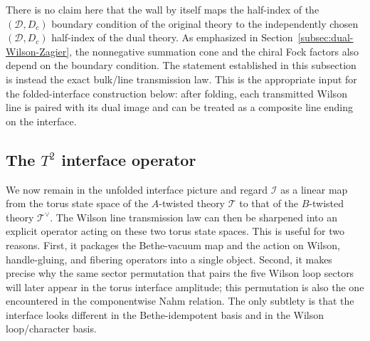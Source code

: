 \documentclass[11pt,a4paper]{article}
\numberwithin{equation}{section}
\begin{document}
There is no claim here that the wall by itself maps the half-index of the $(\mathcal D,D_c)$ boundary condition of the original theory to the independently chosen $(\mathcal D,D_c)$ half-index of the dual theory.  As emphasized in Section~\ref{subsec:dual-Wilson-Zagier}, the nonnegative summation cone and the chiral Fock factors also depend on the boundary condition.  The statement established in this subsection is instead the exact bulk/line transmission law.  This is the appropriate input for the folded-interface construction below: after folding, each transmitted Wilson line is paired with its dual image and can be treated as a composite line ending on the interface.


\subsection{The $T^2$ interface operator}
\label{subsec:T2-interface-operator}

We now remain in the unfolded interface picture and regard $\mathcal I$ as a linear map from the torus state space of the $A$-twisted theory $\mathcal T$ to that of the $B$-twisted theory $\mathcal T^\vee$.  The Wilson line transmission law can then be sharpened into an explicit operator acting on these two torus state spaces.  This is useful for two reasons.  First, it packages the Bethe-vacuum map and the action on Wilson, handle-gluing, and fibering operators into a single object.  Second, it makes precise why the same sector permutation that pairs the five Wilson loop sectors will later appear in the torus interface amplitude; this permutation is also the one encountered in the componentwise Nahm relation.  The only subtlety is that the interface looks different in the Bethe-idempotent basis and in the Wilson loop/character basis.
\end{document}

